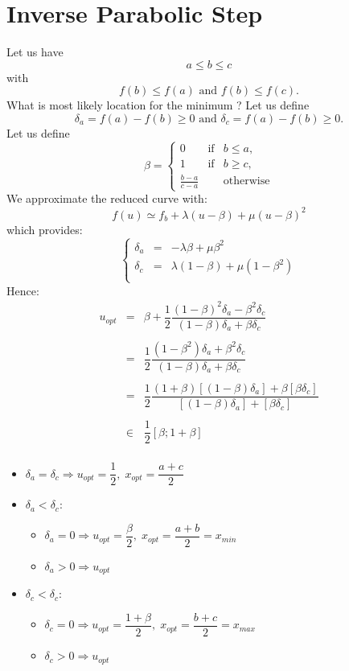 \documentclass[aps,12pt]{revtex4}
\begin{document}

\section{Inverse Parabolic Step}

Let us have 
$$a \leq b \leq c$$ 
with 
$$f(b)\leq f(a) \text{ and } f(b)\leq f(c).$$
What is most likely location for the minimum ?
Let us define $$\delta_a = f(a)-f(b) \geq 0 \text{ and } \delta_c = f(a)-f(b)  \geq 0.$$ 
Let us define 
$$
	\beta = 
	\left\lbrace
	\begin{array}{rcl}
	0 & \text{if} & b\leq a,\\
	1 & \text{if} & b\geq c,\\
	\frac{b-a}{c-a} & & \text{otherwise}
	\end{array}
	\right.
$$
We approximate the reduced curve with:
$$
	f(u) \simeq f_b + \lambda (u-\beta)  + \mu (u-\beta)^2
$$
which provides:
$$
\left\lbrace
\begin{array}{rcl}
	\delta_a & = & -\lambda \beta + \mu \beta^2 \\
	\delta_c & = & \lambda(1-\beta) + \mu (1-\beta^2)\\
\end{array}
\right.
$$
Hence:
$$
\begin{array}{rcl}
	u_{opt} & = & \beta + \dfrac{1}{2} \dfrac{(1-\beta)^2 \delta_a - \beta^2 \delta_c }{(1-\beta)\delta_a + \beta \delta_c}\\
	\\
	 & = & \dfrac{1}{2} \dfrac{(1-\beta^2)\delta_a + \beta^2 \delta_c }{(1-\beta)\delta_a + \beta \delta_c}\\
	 \\
	 & = & \dfrac{1}{2} \dfrac{ (1+\beta)\left[(1-\beta)\delta_a\right] + \beta \left[\beta \delta_c\right] }{ \left[(1-\beta)\delta_a\right] + \left[\beta \delta_c\right] }\\
	 \\
	 & \in & \dfrac{1}{2} \left[ \beta; 1+\beta\right]\\ 
\end{array}
$$

\begin{itemize}
\item $\delta_a=\delta_c \Rightarrow u_{opt}=\dfrac{1}{2}, \; x_{opt}= \dfrac{a+c}{2}$
\item $\delta_a<\delta_c$:
	\begin{itemize}
	\item $\delta_a=0 \Rightarrow u_{opt} = \dfrac{\beta}{2}, \; x_{opt} = \dfrac{a+b}{2} = x_{min}$
	\item $\delta_a>0 \Rightarrow u_{opt}$
	\end{itemize}
\item $\delta_c<\delta_c$:
	\begin{itemize}
	\item $\delta_c=0 \Rightarrow u_{opt} = \dfrac{1+\beta}{2}, \;x_{opt} = \dfrac{b+c}{2} = x_{max}$
	\item $\delta_c>0 \Rightarrow u_{opt}$
	\end{itemize}
\end{itemize}
\end{document}
